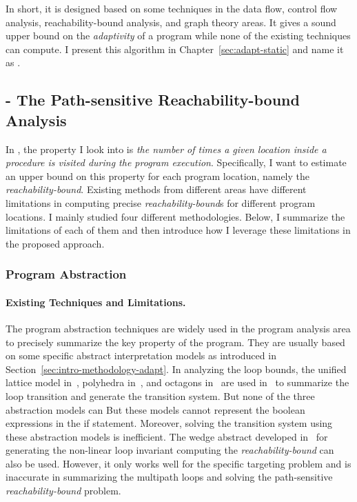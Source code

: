 In short, it is designed based on some techniques in the data flow, control flow analysis, reachability-bound analysis, and graph theory areas.
It gives a sound upper bound on the \emph{adaptivity} of a program while none of the existing techniques can compute.
I present this algorithm in Chapter~\ref{sec:adapt-static} and name it as {\THESYSTEM}.




\subsection{ - The Path-sensitive Reachability-bound Analysis}
\label{sec:intro-methodology-reachability}
In ,
the property I look into is \emph{the number of times a given location inside a procedure is visited during the program
execution}.
Specifically, I want to estimate an upper bound on this property for each program location, namely the \emph{reachability-bound}.
Existing methods from different areas have different limitations in computing precise \emph{reachability-bound}s for different program locations.
I mainly studied four different methodologies.
Below, I summarize the limitations of each of them
and then introduce how I leverage these limitations in the proposed approach.

\subsubsection{Program Abstraction}
\paragraph{Existing Techniques and Limitations.}
The program abstraction techniques are widely used in the program analysis area to precisely summarize the key property of the program. They are usually based on some specific abstract interpretation models as introduced in Section~\ref{sec:intro-methodology-adapt}.
In analyzing the loop bounds, the unified lattice model in~\cite{CousotH78}, polyhedra in~\cite{CousotC77}, and octagons in~\cite{Mine06} are used in~\cite{GulwaniZ10} to summarize the loop transition and generate the transition system.
But none of the three abstraction models can 
But these models cannot represent the boolean expressions in the if statement.
Moreover, solving the transition system using these abstraction models is inefficient. The wedge abstract developed in~\cite{KincaidCBR18} for generating the non-linear loop invariant
computing the \emph{reachability-bound} can also be used. However, it only works well for the specific targeting problem and is inaccurate in summarizing the multipath loops and solving the path-sensitive \emph{reachability-bound} problem. 


